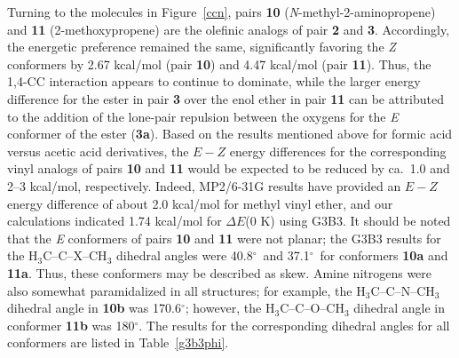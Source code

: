 \documentclass[12pt]{report}
\def\deg{$^{\circ}$}
\def\tablab{Table}\def\tabslab{\tablab s}
\def\figlab{Figure}\def\figslab{\figlab s}
\newcommand*\tbl[1]{\tablab~\ref{#1}}
\newcommand*\fig[1]{\figlab~\ref{#1}}
\begin{document}
Turning to the molecules in \fig{ccn}, pairs \textbf{10} (\textit{N}-methyl-2-aminopropene) and \textbf{11} (2-methoxypropene) are the olefinic analogs of pair \textbf{2} and \textbf{3}. Accordingly, the energetic preference remained the same, significantly favoring the \textit{Z} conformers by 2.67 kcal/mol (pair \textbf{10}) and 4.47 kcal/mol (pair \textbf{11}). Thus, the 1,4-CC interaction appears to continue to dominate, while the larger energy difference for the ester in pair \textbf{3} over the enol ether in pair \textbf{11} can be attributed to the addition of the lone-pair repulsion between the oxygens for the \textit{E} conformer of the ester (\textbf{3a}). Based on the results mentioned above for formic acid versus acetic acid derivatives, the $E-Z$ energy differences for the corresponding vinyl analogs of pairs \textbf{10} and \textbf{11} would be expected to be reduced by ca.\ 1.0 and 2--3 kcal/mol, respectively. Indeed, MP2/6-31G results have provided an $E-Z$ energy difference of about 2.0 kcal/mol for methyl vinyl ether,\cite{nobes} and our calculations indicated 1.74 kcal/mol for $\Delta E$(0 K) using G3B3. It should be noted that the \textit{E} conformers of pairs \textbf{10} and \textbf{11} were not planar; the G3B3 results for the H$_3$C--C--X--CH$_3$ dihedral angles were 40.8\deg\ and 37.1\deg\ for conformers \textbf{10a} and \textbf{11a}. Thus, these conformers may be described as skew. Amine nitrogens were also somewhat paramidalized in all structures; for example, the H$_3$C--C--N--CH$_3$ dihedral angle in \textbf{10b} was 170.6\deg{}; however, the H$_3$C--C--O--CH$_3$ dihedral angle in conformer \textbf{11b} was 180\deg. The results for the corresponding dihedral angles for all conformers are listed in \tbl{g3b3phi}.
\end{document}
